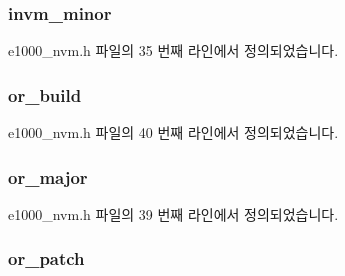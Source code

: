 \subsubsection[{\texorpdfstring{invm\+\_\+minor}{invm_minor}}]{ invm\+\_\+minor}\hypertarget{structe1000__fw__version_af9630c7096a720eae7ca1a3bebc8c0a0}{}\label{structe1000__fw__version_af9630c7096a720eae7ca1a3bebc8c0a0}


e1000\+\_\+nvm.\+h 파일의 35 번째 라인에서 정의되었습니다.

\subsubsection[{\texorpdfstring{or\+\_\+build}{or_build}}]{ or\+\_\+build}\hypertarget{structe1000__fw__version_a6a386b87d0516b416926b25af0fef70a}{}\label{structe1000__fw__version_a6a386b87d0516b416926b25af0fef70a}


e1000\+\_\+nvm.\+h 파일의 40 번째 라인에서 정의되었습니다.

\subsubsection[{\texorpdfstring{or\+\_\+major}{or_major}}]{ or\+\_\+major}\hypertarget{structe1000__fw__version_a9d2710084fb7ff3586782f286a10488c}{}\label{structe1000__fw__version_a9d2710084fb7ff3586782f286a10488c}


e1000\+\_\+nvm.\+h 파일의 39 번째 라인에서 정의되었습니다.

\subsubsection[{\texorpdfstring{or\+\_\+patch}{or_patch}}]{ or\+\_\+patch}\hypertarget{structe1000__fw__version_a61eb65e8189191d63067cf877e6c5dac}{}\label{structe1000__fw__version_a61eb65e8189191d63067cf877e6c5dac}


